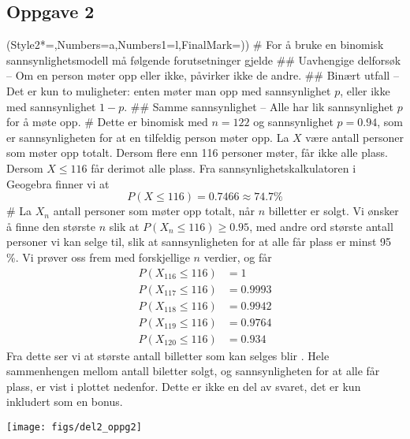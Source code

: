 \subsection*{Oppgave 2}
\begin{easylist}[enumerate]
	\ListProperties(Style2*=,Numbers=a,Numbers1=l,FinalMark={)})
	# For å bruke en binomisk sannsynlighetsmodell må følgende forutsetninger gjelde
	## Uavhengige delforsøk -- Om en person møter opp eller ikke, påvirker ikke de andre.
	## Binært utfall -- Det er kun to muligheter: enten møter man opp med sannsynlighet $p$, eller ikke med sannsynlighet $1 - p$.
	## Samme sannsynlighet -- Alle har lik sannsynlighet $p$ for å møte opp.
	# Dette er binomisk med $n = 122$ og sannsynlighet $p = 0.94$, som er sannsynligheten for at en tilfeldig person møter opp. La $X$ være antall personer som møter opp totalt. Dersom flere enn 116 personer møter, får ikke alle plass. Dersom $X \leq 116$ får derimot alle plass.
	Fra sannsynlighetskalkulatoren i Geogebra finner vi at
	\begin{equation*}
		P(X \leq 116) = 0.7466 \approx 74.7 \%
	\end{equation*}
	# La $X_n$ antall personer som møter opp totalt, når $n$ billetter er solgt. Vi ønsker å finne den største $n$ slik at $P(X_n \leq 116) \geq 0.95$, med andre ord største antall personer vi kan selge til, slik at sannsynligheten for at alle får plass er minst 95 \%.
	Vi prøver oss frem med forskjellige $n$ verdier, og får
	\begin{align*}
		P(X_{116} \leq 116) &= 1 \\
		P(X_{117} \leq 116) &= 0.9993 \\
		P(X_{118} \leq 116) &= 0.9942 \\
		P(X_{119} \leq 116) &= 0.9764 \\
		P(X_{120} \leq 116) &= 0.934 
	\end{align*}
	Fra dette ser vi at største antall billetter som kan selges blir .
	Hele sammenhengen mellom antall biletter solgt, og sannsynligheten for at alle får plass, er vist i plottet nedenfor. Dette er ikke en del av svaret, det er kun inkludert som en bonus.
	\begin{center}
		\texttt{[image: figs/del2\_oppg2]}
	\end{center}
\end{easylist}


